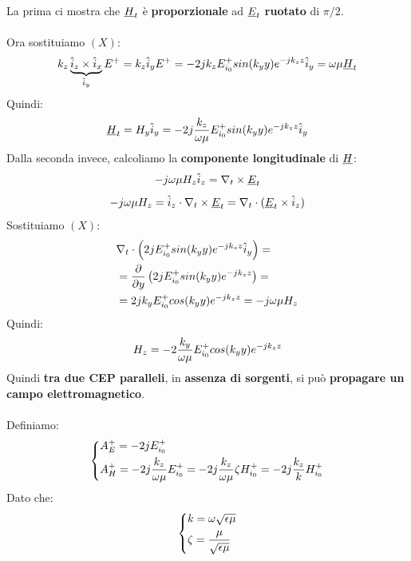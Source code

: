 La prima ci mostra che $\underline{H}_t$ è \textbf{proporzionale} ad $\underline{E}_t$ \textbf{ruotato} di $\pi/2$.\\ \\
Ora sostituiamo $(X)$:
\begin{equation*}
    k_z \underbrace{\hat{i}_z \times \hat{i}_x}_{\hat{i}_y} E^+ = k_z \hat{i}_y E^+ = - 2 j k_z E^+_{i_0} sin(k_y y) e^{-j k_z z} \hat{i}_y = \omega \mu \underline{H}_t
\end{equation*}
Quindi:
\begin{equation*}
    \underline{H}_t = H_y \hat{i}_y = -2j\frac{k_z}{\omega \mu} E^+_{i_0} sin(k_y y) e^{-j k_z z}\hat{i}_y
\end{equation*}
Dalla seconda invece, calcoliamo la \textbf{componente longitudinale} di $\underline{H}$:
\begin{equation*}
    - j\omega \mu H_z \hat{i}_z =  \nabla_t \times \underline{E}_t
\end{equation*}
\begin{equation*}
    - j\omega \mu H_z = \hat{i}_z \cdot \nabla_t \times \underline{E}_t = \nabla_t \cdot (\underline{E}_t \times \hat{i}_z)
\end{equation*}
Sostituiamo $(X)$:
\begin{equation*}
\begin{aligned}
    &\nabla_t \cdot \left(2jE^+_{i_0} sin(k_y y) e^{-j k_z z}\hat{i}_y\right) =\\
    &= \frac{\partial}{\partial y} \left(2j E^+_{i_0} sin(k_y y) e^{-j k_z z}\right) = \\
    &= 2j k_y E^+_{i_0} cos(k_y y) e^{-j k_z z} =  - j\omega \mu H_z
\end{aligned}
\end{equation*}
Quindi:
\begin{equation*}
    H_z = -2 \frac{k_y}{\omega \mu} E^+_{i_0}cos(k_y y) e^{-j k_z z}
\end{equation*}
Quindi \textbf{tra due CEP paralleli}, in \textbf{assenza di sorgenti}, si può \textbf{propagare un campo elettromagnetico}.\\ \\
Definiamo:
\begin{equation*}
\begin{dcases}
    A^+_E = -2j E^+_{i_0}\\
    A^+_H = -2j\frac{k_z}{\omega \mu} E^+_{i_0} =  -2j\frac{k_z}{\omega \mu} \zeta H^+_{i_0} =  -2j\frac{k_z}{k} H^+_{i_0}
\end{dcases}
\end{equation*}
Dato che:
\begin{equation*}
    \begin{dcases}
    k = \omega \sqrt{\epsilon \mu}\\
    \zeta = \frac{\mu}{\sqrt{\epsilon \mu}}
    \end{dcases}
\end{equation*}
